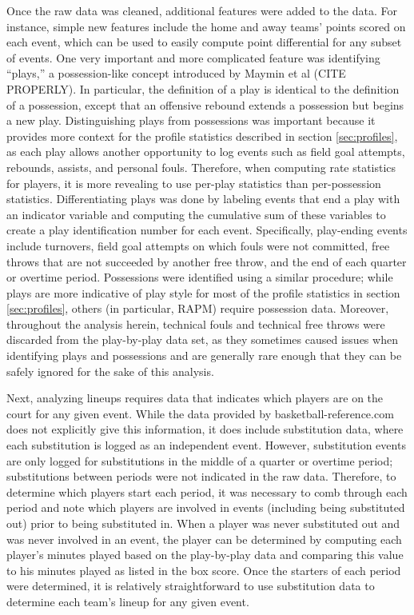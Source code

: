Once the raw data was cleaned, additional features were added to the data. For
instance, simple new features include the home and away teams' points scored on each
event, which can be used to easily compute point differential for any subset of
events. One very important and more complicated feature was identifying ``plays,'' a
possession-like concept introduced by Maymin et al (CITE PROPERLY). In particular,
the definition of a play is identical to the definition of a possession, except that
an offensive rebound extends a possession but begins a new play. Distinguishing
plays from possessions was important because it provides more context for the
profile statistics described in section \ref{sec:profiles}, as each play allows
another opportunity to log events such as field goal attempts, rebounds, assists,
and personal fouls. Therefore, when computing rate statistics for players, it is
more revealing to use per-play statistics than per-possession statistics.
Differentiating plays was done by labeling events that end a play with an indicator
variable and computing the cumulative sum of these variables to create a play
identification number for each event. Specifically, play-ending events include
turnovers, field goal attempts on which fouls were not committed, free throws that
are not succeeded by another free throw, and the end of each quarter or overtime
period. Possessions were identified using a similar procedure; while plays are more
indicative of play style for most of the profile statistics in section
\ref{sec:profiles}, others (in particular, RAPM) require possession data. Moreover,
throughout the analysis herein, technical fouls and technical free throws were
discarded from the play-by-play data set, as they sometimes caused issues when
identifying plays and possessions and are generally rare enough that they can be
safely ignored for the sake of this analysis.

Next, analyzing lineups requires data that indicates which players are on the court
for any given event. While the data provided by basketball-reference.com does not
explicitly give this information, it does include substitution data, where each
substitution is logged as an independent event. However, substitution events are
only logged for substitutions in the middle of a quarter or overtime period;
substitutions between periods were not indicated in the raw data. Therefore, to
determine which players start each period, it was necessary to comb through each
period and note which players are involved in events (including being substituted
out) prior to being substituted in. When a player was never substituted out and was
never involved in an event, the player can be determined by computing each player's
minutes played based on the play-by-play data and comparing this value to his
minutes played as listed in the box score. Once the starters of each period were
determined, it is relatively straightforward to use substitution data to determine
each team's lineup for any given event.

